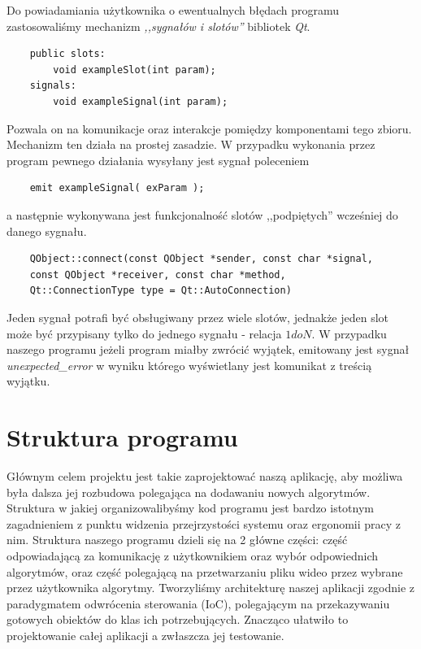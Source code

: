 \documentclass[twoside]{projektInzynierskiMS}
\begin{document}
Do powiadamiania użytkownika o ewentualnych błędach programu zastosowaliśmy mechanizm \emph{,,sygnałów i slotów''} bibliotek \emph{Qt}. 
\begin{verbatim}
	public slots:
	    void exampleSlot(int param);
	signals:
	    void exampleSignal(int param);
\end{verbatim}
Pozwala on na komunikacje oraz interakcje pomiędzy komponentami tego zbioru. Mechanizm ten działa na prostej zasadzie. W przypadku wykonania przez program pewnego działania wysyłany jest sygnał poleceniem
\begin{verbatim}
	emit exampleSignal( exParam );
\end{verbatim}
a następnie wykonywana jest funkcjonalność slotów ,,podpiętych'' wcześniej do danego sygnału. 
\begin{verbatim}
	QObject::connect(const QObject *sender, const char *signal, 
	const QObject *receiver, const char *method, 
	Qt::ConnectionType type = Qt::AutoConnection)
\end{verbatim}
Jeden sygnał potrafi być obsługiwany przez wiele slotów, jednakże jeden slot może być przypisany tylko do jednego sygnału - relacja $1 do N$.
W przypadku naszego programu jeżeli program miałby zwrócić wyjątek, emitowany jest sygnał \emph{unexpected\_error} w wyniku którego wyświetlany jest komunikat z treścią wyjątku.

\section{Struktura programu}

Głównym celem projektu jest takie zaprojektować naszą aplikację, aby możliwa była dalsza jej rozbudowa polegająca na dodawaniu nowych algorytmów. Struktura w jakiej organizowalibyśmy kod programu jest bardzo istotnym zagadnieniem z punktu widzenia przejrzystości systemu oraz ergonomii pracy z nim. Struktura naszego programu dzieli się na 2 główne części: część odpowiadającą za komunikację z użytkownikiem oraz wybór odpowiednich algorytmów, oraz część polegającą na przetwarzaniu pliku wideo przez wybrane przez użytkownika algorytmy. Tworzyliśmy architekturę naszej aplikacji zgodnie z paradygmatem odwrócenia sterowania (IoC), polegającym na przekazywaniu gotowych obiektów do klas ich potrzebujących. Znacząco ułatwiło to projektowanie całej aplikacji a zwłaszcza jej testowanie.
\end{document}
